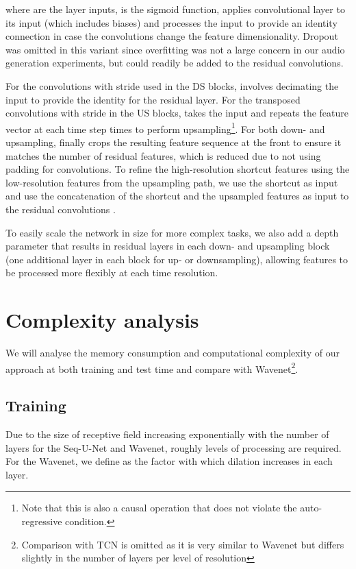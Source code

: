 \documentclass{article}
\begin{document}
where  are the layer inputs,  is the sigmoid function,  applies convolutional layer  to its input (which includes biases) and  processes the input  to provide an identity connection in case the convolutions change the feature dimensionality.
Dropout was omitted in this variant since overfitting was not a large concern in our audio generation experiments, but could readily be added to the residual convolutions.

For the convolutions with stride used in the DS blocks,  involves decimating the input  to provide the identity for the residual layer. 
For the transposed convolutions with stride in the US blocks,  takes the input and repeats the feature vector at each time step  times to perform upsampling\footnote{Note that this is also a causal operation that does not violate the auto-regressive condition.}.
For both down- and upsampling,  finally crops the resulting feature sequence at the front to ensure it matches the number of residual features, which is reduced due to not using padding for convolutions.
To refine the high-resolution shortcut features using the low-resolution features from the upsampling path, we use the shortcut as input  and use the concatenation of the shortcut and the upsampled features as input to the residual convolutions .

To easily scale the network in size for more complex tasks, we also add a depth parameter  that results in  residual layers in each down- and upsampling block (one additional layer in each block for up- or downsampling), allowing features to be processed more flexibly at each time resolution. 

\section{Complexity analysis}
\label{sec:complexity}

We will analyse the memory consumption and computational complexity of our approach at both training and test time and compare with Wavenet\footnote{Comparison with TCN is omitted as it is very similar to Wavenet but differs slightly in the number of layers per level of resolution}.

\subsection{Training}
\label{sec:complexity_training}

Due to the size  of receptive field increasing exponentially with the number of layers for the Seq-U-Net and Wavenet, roughly  levels of processing are required. 
For the Wavenet, we define  as the factor with which dilation increases in each layer.
\end{document}
